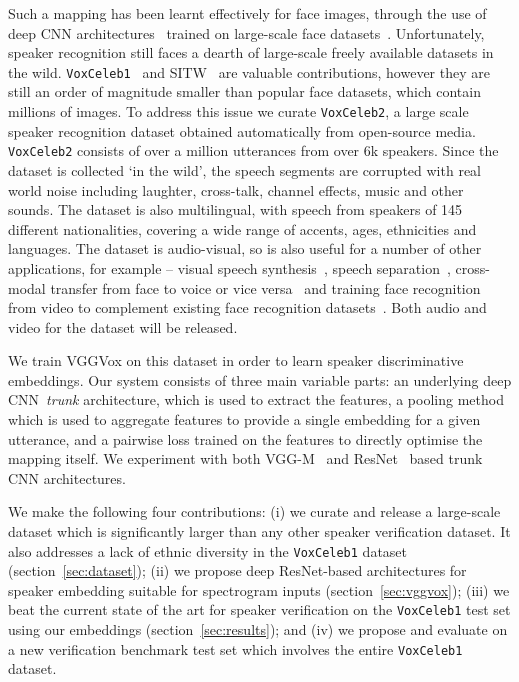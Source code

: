 \documentclass[a4paper]{article}
\begin{document}
Such a mapping has been learnt effectively for face images, through
the use of deep CNN
architectures~\cite{Schroff15,taigman2014deepface,Parkhi15} trained on
large-scale face
datasets~\cite{cao2017vggface2,kemelmacher2016megaface,guo2016ms}. Unfortunately,
speaker recognition still faces a dearth of large-scale freely
available datasets in the wild. \texttt{VoxCeleb1}~\cite{Nagrani17}
and SITW~\cite{Mclaren16} are valuable contributions, however they are
still an order of magnitude smaller than popular face datasets, which
contain millions of images. To address this issue we curate
\texttt{VoxCeleb2}, a large scale speaker recognition dataset obtained
automatically from open-source media. \texttt{VoxCeleb2} consists of
over a million utterances from over 6k speakers. Since the dataset is
collected `in the wild', the speech segments are corrupted with real
world noise including laughter, cross-talk, channel effects, music and
other sounds. The dataset is also multilingual, with speech from
speakers of 145 different nationalities, covering a wide range of
accents, ages, ethnicities and languages. 
The dataset is audio-visual,
 so is also useful for a number of other applications, for example --
 visual speech synthesis~\cite{Chung17b,karras2017audio}, speech separation~\cite{Afouras18,ephrat2018looking}, cross-modal transfer from face to voice or vice versa~\cite{Nagrani18a,nagrani2018learnable}
 and training face recognition
from video to complement existing face recognition datasets~\cite{cao2017vggface2,kemelmacher2016megaface,guo2016ms}. 
Both audio
 and video for the dataset will be released.

We train VGGVox on this dataset in order to learn speaker
discriminative embeddings. Our system consists of three main variable
parts: an underlying deep CNN~\textit{trunk} architecture, which is
used to extract the features, a pooling method which is used to
aggregate features to provide a single embedding for a given
utterance, and a pairwise loss trained on the features to directly
optimise the mapping itself. We experiment with both VGG-M~\cite{Chatfield14} and ResNet~\cite{He15} 
based trunk CNN architectures.

We make the following four contributions: (i) we curate and release a
large-scale dataset which is significantly larger than any other
speaker verification dataset. It also addresses a lack of ethnic
diversity in the \texttt{VoxCeleb1} dataset
(section~\ref{sec:dataset}); (ii) we propose deep ResNet-based
architectures for speaker embedding suitable for spectrogram inputs
(section~\ref{sec:vggvox}); (iii) we beat the current state of the art for speaker
verification on the \texttt{VoxCeleb1}  test set using our embeddings
(section~\ref{sec:results}); and (iv) we propose 
and evaluate on a new
verification benchmark test set which involves the entire \texttt{VoxCeleb1}  dataset.
\end{document}
